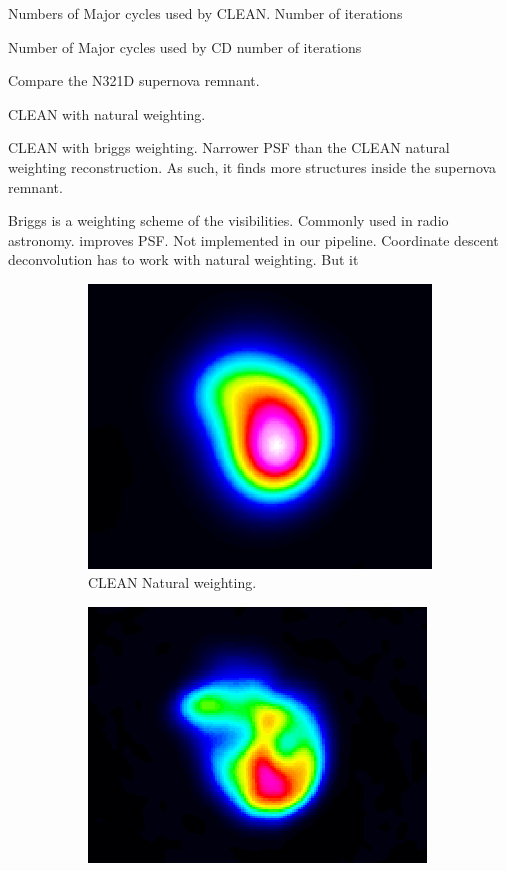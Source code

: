 Numbers of Major cycles used by CLEAN.
Number of iterations

Number of Major cycles used by CD
number of iterations

Compare the N321D supernova remnant.

CLEAN with natural weighting.

CLEAN with briggs weighting. Narrower PSF than the CLEAN natural weighting reconstruction. As such, it finds more structures inside the supernova remnant.

Briggs is a weighting scheme of the visibilities. Commonly used in radio astronomy.
 improves PSF.
 Not implemented in our pipeline.
Coordinate descent deconvolution has to work with natural weighting.
But it

\begin{figure}[h]
	\centering
	\begin{subfigure}[b]{0.3\linewidth}
		\includegraphics[width=1.00\linewidth]{./chapters/10.results/cleancomp/n132_clean.png}
		\caption{CLEAN Natural weighting.}
		\label{results:N132:clean}
	\end{subfigure}
	\begin{subfigure}[b]{0.3\linewidth}
		\includegraphics[width=1.00\linewidth]{./chapters/10.results/cleancomp/n132_clean_briggs.png}

\end{subfigure}
\end{figure}
